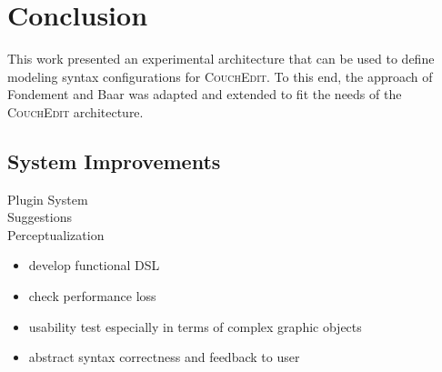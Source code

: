 \chapter{Conclusion}
\label{chap:conclusion}

This work presented an experimental architecture that can be used to define modeling syntax configurations for \textsc{CouchEdit}. To this end, the approach of Fondement and Baar \cite{fondement_making_2005} was adapted and extended to fit the needs of the \textsc{CouchEdit} architecture. 


\section{System Improvements}


\begin{description}
  \item[Plugin System]
  \item[Suggestions] 
  \item[Perceptualization]  
\end{description}

\begin{itemize}
  \item develop functional DSL
  \item check performance loss
  \item usability test especially in terms of complex graphic objects
  \item abstract syntax correctness and feedback to user
\end{itemize}

